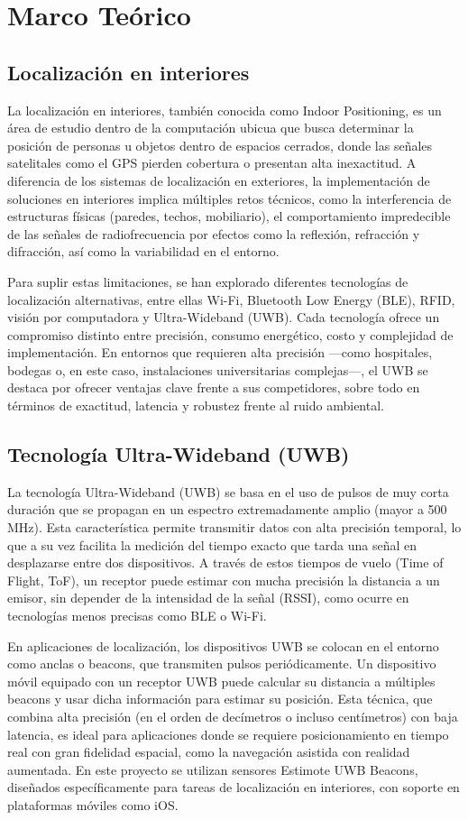 \section{Marco Teórico}
\subsection{Localización en interiores}
{\justify La localización en interiores, también conocida como Indoor Positioning, es un área de estudio dentro de la computación ubicua que busca determinar la posición de personas u objetos dentro de espacios cerrados, donde las señales satelitales como el GPS pierden cobertura o presentan alta inexactitud. A diferencia de los sistemas de localización en exteriores, la implementación de soluciones en interiores implica múltiples retos técnicos, como la interferencia de estructuras físicas (paredes, techos, mobiliario), el comportamiento impredecible de las señales de radiofrecuencia por efectos como la reflexión, refracción y difracción, así como la variabilidad en el entorno.

Para suplir estas limitaciones, se han explorado diferentes tecnologías de localización alternativas, entre ellas Wi-Fi, Bluetooth Low Energy (BLE), RFID, visión por computadora y Ultra-Wideband (UWB). Cada tecnología ofrece un compromiso distinto entre precisión, consumo energético, costo y complejidad de implementación. En entornos que requieren alta precisión —como hospitales, bodegas o, en este caso, instalaciones universitarias complejas—, el UWB se destaca por ofrecer ventajas clave frente a sus competidores, sobre todo en términos de exactitud, latencia y robustez frente al ruido ambiental.}


\subsection{Tecnología Ultra-Wideband (UWB)}
{\justify La tecnología Ultra-Wideband (UWB) se basa en el uso de pulsos de muy corta duración que se propagan en un espectro extremadamente amplio (mayor a 500 MHz). Esta característica permite transmitir datos con alta precisión temporal, lo que a su vez facilita la medición del tiempo exacto que tarda una señal en desplazarse entre dos dispositivos. A través de estos tiempos de vuelo (Time of Flight, ToF), un receptor puede estimar con mucha precisión la distancia a un emisor, sin depender de la intensidad de la señal (RSSI), como ocurre en tecnologías menos precisas como BLE o Wi-Fi.

En aplicaciones de localización, los dispositivos UWB se colocan en el entorno como anclas o beacons, que transmiten pulsos periódicamente. Un dispositivo móvil equipado con un receptor UWB puede calcular su distancia a múltiples beacons y usar dicha información para estimar su posición. Esta técnica, que combina alta precisión (en el orden de decímetros o incluso centímetros) con baja latencia, es ideal para aplicaciones donde se requiere posicionamiento en tiempo real con gran fidelidad espacial, como la navegación asistida con realidad aumentada. En este proyecto se utilizan sensores Estimote UWB Beacons, diseñados específicamente para tareas de localización en interiores, con soporte en plataformas móviles como iOS.}


